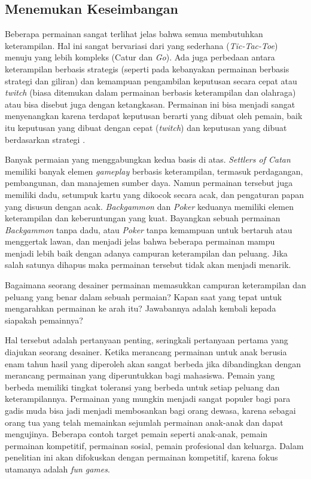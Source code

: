 \subsection{Menemukan Keseimbangan}
\label{sec:sub_sec2_keseimbangan}
\vspace{1ex}

Beberapa permainan sangat terlihat jelas bahwa semua membutuhkan keterampilan. Hal ini sangat bervariasi dari yang sederhana (\textit{Tic-Tac-Toe}) menuju yang lebih kompleks (Catur dan \textit{Go}). Ada juga perbedaan antara keterampilan berbasis strategis (seperti pada kebanyakan permainan berbasis strategi dan giliran) dan kemampuan pengambilan keputusan secara cepat atau \textit{twitch} (biasa ditemukan dalam permainan berbasis keterampilan dan olahraga) atau bisa disebut juga dengan ketangkasan. Permainan ini bisa menjadi sangat menyenangkan karena terdapat keputusan berarti yang dibuat oleh pemain, baik itu keputusan yang dibuat dengan cepat (\textit{twitch}) dan keputusan yang dibuat berdasarkan strategi \citep{Brathwaite2009}.
\vspace{1ex}

Banyak permaian yang menggabungkan kedua basis di atas. \textit{Settlers of Catan} memiliki banyak elemen \textit{gameplay} berbasis keterampilan, termasuk perdagangan, pembangunan, dan manajemen sumber daya. Namun permainan tersebut juga memiliki dadu, setumpuk kartu yang dikocok secara acak, dan pengaturan papan yang disusun dengan acak. \textit{Backgammon} dan \textit{Poker} keduanya memiliki elemen keterampilan dan keberuntungan yang kuat. Bayangkan sebuah permainan \textit{Backgammon} tanpa dadu, atau \textit{Poker} tanpa kemampuan untuk bertaruh atau menggertak lawan, dan menjadi jelas bahwa beberapa permainan mampu menjadi lebih baik dengan adanya campuran keterampilan dan peluang. Jika salah satunya dihapus maka permainan tersebut tidak akan menjadi menarik.
\vspace{1ex}

Bagaimana seorang desainer permainan memasukkan campuran keterampilan dan peluang yang benar dalam sebuah permaian? Kapan saat yang tepat untuk mengarahkan permainan ke arah itu? Jawabannya adalah kembali kepada siapakah pemainnya?
\vspace{1ex}

Hal tersebut adalah pertanyaan penting, seringkali pertanyaan pertama yang diajukan seorang desainer. Ketika merancang permainan untuk anak berusia enam tahun hasil yang diperoleh akan sangat berbeda jika dibandingkan dengan merancang permainan yang diperuntukkan bagi mahasiswa. Pemain yang berbeda memiliki tingkat toleransi yang berbeda untuk setiap peluang dan keterampilannya. Permainan yang mungkin menjadi sangat populer bagi para gadis muda bisa jadi menjadi membosankan bagi orang dewasa, karena sebagai orang tua yang telah memainkan sejumlah permainan anak-anak dan dapat mengujinya. Beberapa contoh target pemain seperti anak-anak, pemain permainan kompetitif, permainan sosial, pemain profesional dan keluarga. Dalam penelitian ini akan difokuskan dengan permainan kompetitif, karena fokus utamanya adalah \textit{fun games}.
\vspace{1ex}

